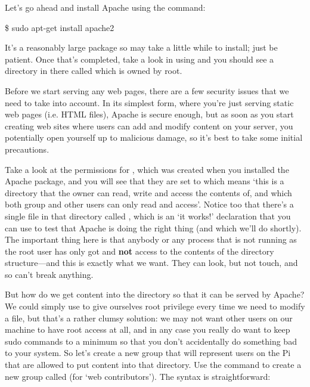 Let's go ahead and install Apache using the command:

\begin{ttoutenv}
\$ sudo apt-get install apache2
\end{ttoutenv}

It's a reasonably large package so may take a little while to install; just be patient. Once that's completed, take a look in  using  and you should see a directory in there called  which is owned by root.

Before we start serving any web pages, there are a few security issues that we need to take into account. In its simplest form, where you're just serving static web pages (i.e. HTML files), Apache is secure enough, but as soon as you start creating web sites where users can add and modify content on your server, you potentially open yourself up to malicious damage, so it's best to take some initial precautions.

Take a look at the permissions for , which was created when you installed the Apache package, and you will see that they are set to  which means `this is a directory that the owner can read, write and access the contents of, and which both group and other users can only read and access'. Notice too that there's a single file in that directory called , which is an `it works!' declaration that you can use to test that Apache is doing the right thing (and which we'll do shortly). The important thing here is that anybody or any process that is not running as the root user has only got  and \textbf{not}  access to the contents of the  directory structure---and this is exactly what we want. They can look, but not touch, and so can't break anything.

But how do we get content into the  directory so that it can be served by Apache? We could simply use  to give ourselves root privilege every time we need to modify a file, but that's a rather clumsy solution: we may not want other users on our machine to have root access at all, and in any case you really do want to keep sudo commands to a minimum so that you don't accidentally do something bad to your system. So let's create a new group that will represent users on the Pi that are allowed to put content into that directory. Use the command  to create a new group called  (for `web contributors'). The syntax is straightforward:

